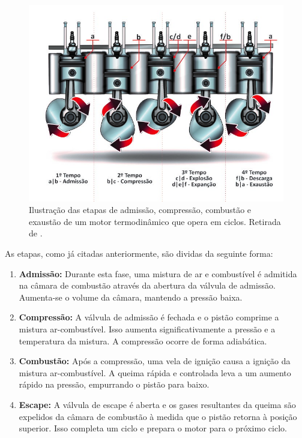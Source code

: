 \documentclass[10pt, conference, letterpaper]{IEEEtran}
\begin{document}
\begin{figure}[H]
    \centering
    \includegraphics[width=\columnwidth]{Imagens/etapas-do-motor-ciclo-otto.jpg}
    \caption{Ilustração das etapas de admissão, compressão, combustão e exaustão de um motor termodinâmico que opera em ciclos. Retirada de \cite{reference3}.}
    \label{fig:motor-ilustracao}
\end{figure}

As etapas, como já citadas anteriormente, são dividas da seguinte forma:
\begin{enumerate}
    \item \textbf{Admissão:} Durante esta fase, uma mistura de ar e combustível é admitida na câmara de combustão através da abertura da válvula de admissão. Aumenta-se o volume da câmara, mantendo a pressão baixa.
    
    \item \textbf{Compressão:} A válvula de admissão é fechada e o pistão comprime a mistura ar-combustível. Isso aumenta significativamente a pressão e a temperatura da mistura. A compressão ocorre de forma adiabática.
        
    \item \textbf{Combustão:} Após a compressão, uma vela de ignição causa a ignição da mistura ar-combustível. A queima rápida e controlada leva a um aumento rápido na pressão, empurrando o pistão para baixo.
        
    \item \textbf{Escape:} A válvula de escape é aberta e os gases resultantes da queima são expelidos da câmara de combustão à medida que o pistão retorna à posição superior. Isso completa um ciclo e prepara o motor para o próximo ciclo.
\end{enumerate}
\end{document}
